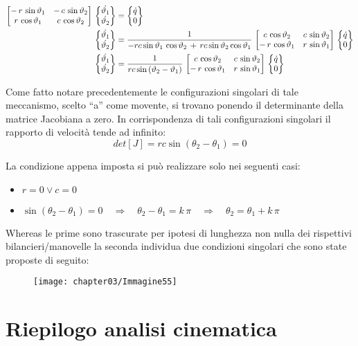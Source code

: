 	\begin{align*}
		\begin{bmatrix}-\,r\,\sin{\vartheta_1}& -\,c\,\sin{\vartheta_2}\\r\,\cos{\vartheta_1}&c\,\cos{\vartheta_2}\end{bmatrix}\,\begin{Bmatrix}\dot{\vartheta_1}\\\dot{\vartheta_2}\end{Bmatrix} &= \begin{Bmatrix}\dot{q}\\0\end{Bmatrix}\\
		\begin{Bmatrix}\dot{\vartheta_1}\\\dot{\vartheta_2}\end{Bmatrix} &= \frac{1}{-rc\sin{\vartheta_1}\,\cos{\vartheta_2}\,+\,rc\sin{\vartheta_2}\cos{\vartheta_1}}\,\begin{bmatrix}c\,\cos{\vartheta_2}&c\,\sin{\vartheta_2}\\-\,r\,\cos{\vartheta_1}&r\,\sin{\vartheta_1}\end{bmatrix}\, \begin{Bmatrix}\dot{q}\\0\end{Bmatrix}\\
		\begin{Bmatrix}\dot{\vartheta_1}\\\dot{\vartheta_2}\end{Bmatrix} &= \frac{1}{rc\sin{(\vartheta_2-\vartheta_1)}}\,\begin{bmatrix}c\,\cos{\vartheta_2}&c\,\sin{\vartheta_2}\\-\,r\,\cos{\vartheta_1}&r\,\sin{\vartheta_1}\end{bmatrix}\, \begin{Bmatrix}\dot{q}\\0\end{Bmatrix}
	\end{align*}
	
	Come fatto notare precedentemente le configurazioni singolari di tale meccanismo, scelto ``a'' come movente, si trovano ponendo il determinante della matrice Jacobiana a zero. In corrispondenza di tali configurazioni singolari il rapporto di velocità tende ad infinito:
	\[
	det[J] = rc\sin{(\theta_2 - \theta_1)} = 0
	\]
		
		La condizione appena imposta si può realizzare solo nei seguenti casi:
		\begin{itemize}
		\item $r = 0 \lor c = 0$
		\item $\sin{(\theta_2 - \theta_1)} = 0\quad\Rightarrow\quad \theta_2 - \theta_1 = k\,\pi \quad \Rightarrow\quad \theta_2 = \theta_1 + k\,\pi$
		\end{itemize}
	
		Whereas le prime sono trascurate per ipotesi di lunghezza non nulla dei rispettivi bilancieri/manovelle la seconda individua due condizioni singolari che sono state proposte di seguito:
		
		\begin{figure}[!ht]
		\centering
		\texttt{[image: chapter03/Immagine55]}
		\end{figure}
		
		\section{Riepilogo analisi cinematica}
